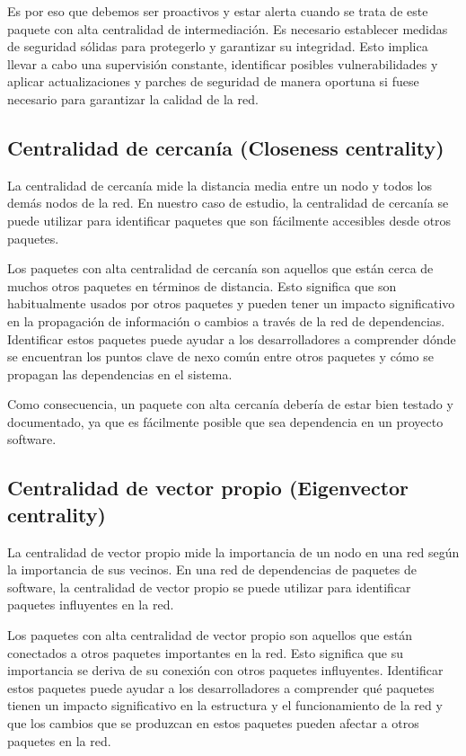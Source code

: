 Es por eso que debemos ser proactivos y estar alerta cuando se trata de este paquete con alta centralidad de intermediación. Es necesario establecer medidas de seguridad sólidas para protegerlo y garantizar su integridad. Esto implica llevar a cabo una supervisión constante, identificar posibles vulnerabilidades y aplicar actualizaciones y parches de seguridad de manera oportuna si fuese necesario para garantizar la calidad de la red.

\subsection{Centralidad de cercanía (Closeness centrality)}

La centralidad de cercanía mide la distancia media entre un nodo y todos los demás nodos de la red. En nuestro caso de estudio, la centralidad de cercanía se puede utilizar para identificar paquetes que son fácilmente accesibles desde otros paquetes.

Los paquetes con alta centralidad de cercanía son aquellos que están cerca de muchos otros paquetes en términos de distancia. Esto significa que son habitualmente usados por otros paquetes y pueden tener un impacto significativo en la propagación de información o cambios a través de la red de dependencias. Identificar estos paquetes puede ayudar a los desarrolladores a comprender dónde se encuentran los puntos clave de nexo común entre otros paquetes y cómo se propagan las dependencias en el sistema.

Como consecuencia, un paquete con alta cercanía debería de estar bien testado y documentado, ya que es fácilmente posible que sea dependencia en un proyecto software.

\subsection{Centralidad de vector propio (Eigenvector centrality)}

La centralidad de vector propio mide la importancia de un nodo en una red según la importancia de sus vecinos. En una red de dependencias de paquetes de software, la centralidad de vector propio se puede utilizar para identificar paquetes influyentes en la red.

Los paquetes con alta centralidad de vector propio son aquellos que están conectados a otros paquetes importantes en la red. Esto significa que su importancia se deriva de su conexión con otros paquetes influyentes. Identificar estos paquetes puede ayudar a los desarrolladores a comprender qué paquetes tienen un impacto significativo en la estructura y el funcionamiento de la red y que los cambios que se produzcan en estos paquetes pueden afectar a otros paquetes en la red.

